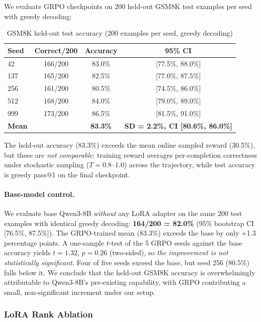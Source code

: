 \documentclass{article}
\begin{document}
We evaluate GRPO checkpoints on 200 held-out GSM8K test examples per seed with greedy decoding:

\begin{table}[htbp]
    \centering
    \caption{GSM8K held-out test accuracy (200 examples per seed, greedy decoding)}
    \begin{tabular}{lccc}
        \toprule
        Seed & Correct/200 & Accuracy & 95\% CI \\
        \midrule
        42  & 166/200 & 83.0\% & [77.5\%, 88.0\%] \\
        137 & 165/200 & 82.5\% & [77.0\%, 87.5\%] \\
        256 & 161/200 & 80.5\% & [74.5\%, 86.0\%] \\
        512 & 168/200 & 84.0\% & [79.0\%, 89.0\%] \\
        999 & 173/200 & 86.5\% & [81.5\%, 91.0\%] \\
        \midrule
        \textbf{Mean} & & \textbf{83.3\%} & \textbf{SD = 2.2\%, CI [80.6\%, 86.0\%]} \\
        \bottomrule
    \end{tabular}
    \label{tab:heldout}
\end{table}

The held-out accuracy (83.3\%) exceeds the mean online sampled reward (30.5\%), but these are \emph{not comparable}: training reward averages per-completion correctness under stochastic sampling ($T{=}0.8$--$1.0$) across the trajectory, while test accuracy is greedy pass@1 on the final checkpoint.

\paragraph{Base-model control.} We evaluate base Qwen3-8B \emph{without} any LoRA adapter on the same 200 test examples with identical greedy decoding: \textbf{164/200 = 82.0\%} (95\% bootstrap CI [76.5\%, 87.5\%]). The GRPO-trained mean (83.3\%) exceeds the base by only +1.3 percentage points. A one-sample $t$-test of the 5 GRPO seeds against the base accuracy yields $t{=}1.32$, $p{=}0.26$ (two-sided), so \emph{the improvement is not statistically significant}. Four of five seeds exceed the base, but seed 256 (80.5\%) falls below it. We conclude that the held-out GSM8K accuracy is overwhelmingly attributable to Qwen3-8B's pre-existing capability, with GRPO contributing a small, non-significant increment under our setup.

\subsubsection{LoRA Rank Ablation}
\end{document}

